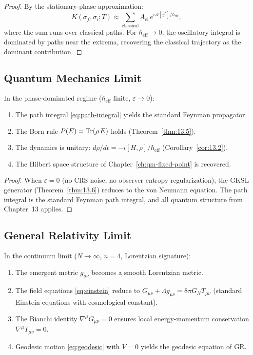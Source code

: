 \begin{proof}
By the stationary-phase approximation:
\[
  K(\sigma_f, \sigma_i; T)
  \approx \sum_{\text{classical}} A_{\text{cl}}\,
  e^{i\mathcal{A}[\gamma^*]/\hbar_{\mathrm{eff}}},
\]
where the sum runs over classical paths.  For $\hbar_{\mathrm{eff}}
\to 0$, the oscillatory integral is dominated by paths near the
extrema, recovering the classical trajectory as the dominant
contribution.
\end{proof}

\subsection{Quantum Mechanics Limit}

\begin{theorem}\label{thm:14.13}
In the phase-dominated regime ($\hbar_{\mathrm{eff}}$ finite,
$\varepsilon \to 0$):
\begin{enumerate}
  \item The path integral \eqref{eq:path-integral} yields the standard
        Feynman propagator.
  \item The Born rule $P(E) = \mathrm{Tr}(\rho\,E)$ holds
        (Theorem~\ref{thm:13.5}).
  \item The dynamics is unitary: $d\rho/dt = -i[H, \rho]/\hbar_{\mathrm{eff}}$
        (Corollary~\ref{cor:13.2}).
  \item The Hilbert space structure of Chapter~\ref{ch:qm-fixed-point}
        is recovered.
\end{enumerate}
\end{theorem}

\begin{proof}
When $\varepsilon = 0$ (no CRS noise, no observer entropy
regularization), the GKSL generator
(Theorem~\ref{thm:13.6}) reduces to the von Neumann equation.  The
path integral is the standard Feynman path integral, and all quantum
structure from Chapter~13 applies.
\end{proof}

\subsection{General Relativity Limit}

\begin{theorem}[GR Recovery]\label{thm:14.14}
In the continuum limit ($N \to \infty$, $n = 4$, Lorentzian
signature):
\begin{enumerate}
  \item The emergent metric $g_{\mu\nu}$ becomes a smooth Lorentzian
        metric.
  \item The field equations \eqref{eq:einstein} reduce to
        $G_{\mu\nu} + \Lambda g_{\mu\nu} = 8\pi G_N T_{\mu\nu}$
        (standard Einstein equations with cosmological constant).
  \item The Bianchi identity $\nabla^\mu G_{\mu\nu} = 0$ ensures
        local energy-momentum conservation
        $\nabla^\mu T_{\mu\nu} = 0$.
  \item Geodesic motion \eqref{eq:geodesic} with $V = 0$
        yields the geodesic equation of GR.
\end{enumerate}
\end{theorem}

